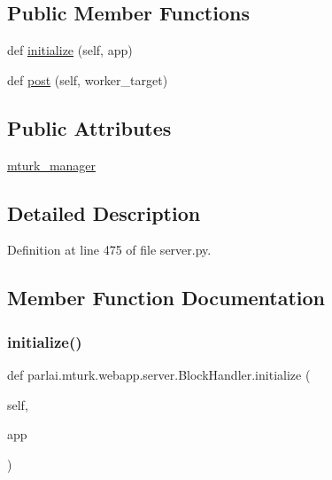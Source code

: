 \subsection*{Public Member Functions}
\begin{DoxyCompactItemize}
\item 
def \hyperlink{classparlai_1_1mturk_1_1webapp_1_1server_1_1BlockHandler_a65b2ae9ac54dc74f947e560654c5d6c3}{initialize} (self, app)
\item 
def \hyperlink{classparlai_1_1mturk_1_1webapp_1_1server_1_1BlockHandler_a8c9de27cced3819aaec3909b50d3b550}{post} (self, worker\+\_\+target)
\end{DoxyCompactItemize}
\subsection*{Public Attributes}
\begin{DoxyCompactItemize}
\item 
\hyperlink{classparlai_1_1mturk_1_1webapp_1_1server_1_1BlockHandler_a478088460fbd6c910d6ca6bcb01b7016}{mturk\+\_\+manager}
\end{DoxyCompactItemize}


\subsection{Detailed Description}


Definition at line 475 of file server.\+py.



\subsection{Member Function Documentation}
\mbox{\label{classparlai_1_1mturk_1_1webapp_1_1server_1_1BlockHandler_a65b2ae9ac54dc74f947e560654c5d6c3}} 
\subsubsection{\texorpdfstring{initialize()}{initialize()}}
{\footnotesize\ttfamily def parlai.\+mturk.\+webapp.\+server.\+Block\+Handler.\+initialize (\begin{DoxyParamCaption}\item[{}]{self,  }\item[{}]{app }\end{DoxyParamCaption})}



